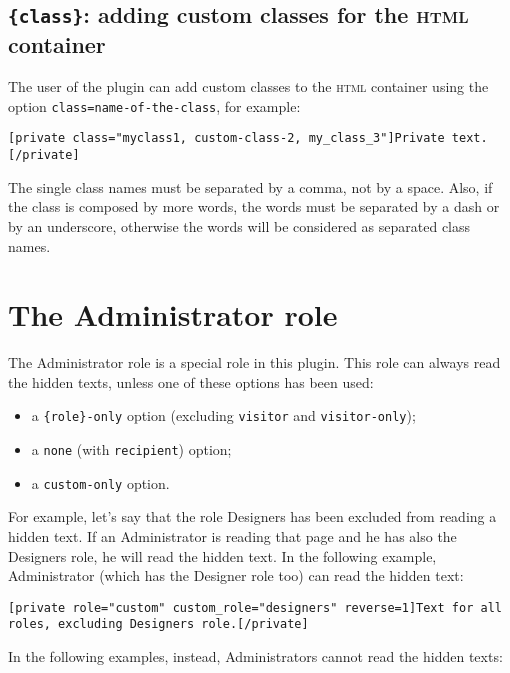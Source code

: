 \subsection{\texttt{\{class\}}: adding custom classes for the \textsc{html} container}

The user of the plugin can add custom classes to the \textsc{html} container
using the option \verb+class=name-of-the-class+, for example:

\begin{lstlisting}
[private class="myclass1, custom-class-2, my_class_3"]Private text.[/private]
\end{lstlisting}

The single class names must be separated by a comma, not by a space. Also, if
the class is composed by more words, the words must be separated by a dash or by
an underscore, otherwise the words will be considered as separated class names.

\section{The Administrator role}

\label{sec:admin-role}

The Administrator role is a special role in this plugin. This role can always
read the hidden texts, unless one of these options has been used:

\begin{itemize}
 \item a \verb+{role}-only+ option (excluding \verb+visitor+ and
 \verb+visitor-only+);
 \item a \verb+none+ (with \verb+recipient+) option;
 \item a \verb+custom-only+ option.
\end{itemize}

For example, let's say that the role Designers has been excluded from reading a
hidden text. If an Administrator is reading that page and he has also the
Designers role, he will read the hidden text. In the following example,
Administrator (which has the Designer role too) can read the hidden text:

\begin{lstlisting}
[private role="custom" custom_role="designers" reverse=1]Text for all roles, excluding Designers role.[/private]
\end{lstlisting}

In the following examples, instead, Administrators cannot read the hidden texts:

